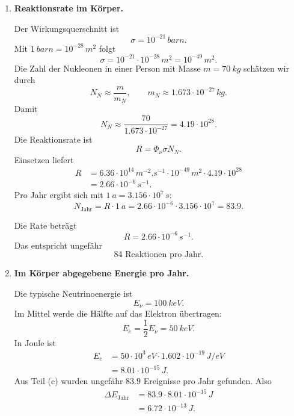 \documentclass[11pt,a4paper]{scrartcl}
\newcommand{\half}{\frac{1}{2}}
\theoremstyle{definition}
\theoremstyle{plain}
\theoremstyle{remark}
\begin{document}
\begin{enumerate}[label=(\alph*)]
    \item \textbf{Reaktionsrate im Körper.}

    \begin{calculationbox}
        Der Wirkungsquerschnitt ist
        \[
            \sigma=10^{-21}\,\si{barn}.
        \]
        Mit $\SI{1}{barn}=10^{-28}\,\si{m^2}$ folgt
        \[
            \sigma=10^{-21}\cdot10^{-28}\,\si{m^2}=10^{-49}\,\si{m^2}.
        \]
        Die Zahl der Nukleonen in einer Person mit Masse $m=\SI{70}{kg}$ schätzen wir durch
        \[
            N_N\approx\frac{m}{m_N},
            \qquad
            m_N\approx1.673\cdot10^{-27}\,\si{kg}.
        \]
        Damit
        \[
            N_N\approx\frac{70}{1.673\cdot10^{-27}}=4.19\cdot10^{28}.
        \]
        Die Reaktionsrate ist
        \[
            R=\Phi_\nu\sigma N_N.
        \]
        Einsetzen liefert
        \[
        \begin{aligned}
            R
            &=6.36\cdot10^{14}\,\si{m^{-2}.s^{-1}}
              \cdot10^{-49}\,\si{m^2}
              \cdot4.19\cdot10^{28}\\
            &=2.66\cdot10^{-6}\,\si{s^{-1}}.
        \end{aligned}
        \]
        Pro Jahr ergibt sich mit $\SI{1}{a}=3.156\cdot10^7\,\si{s}$:
        \[
            N_{\mathrm{Jahr}}
            =R\cdot\SI{1}{a}
            =2.66\cdot10^{-6}\cdot3.156\cdot10^7
            =83.9.
        \]
    \end{calculationbox}

    \begin{answerbox}
        Die Rate beträgt
        \[
            \boxed{R=2.66\cdot10^{-6}\,\si{s^{-1}}}.
        \]
        Das entspricht ungefähr
        \[
            \boxed{84\text{ Reaktionen pro Jahr}}.
        \]
    \end{answerbox}

    \item \textbf{Im Körper abgegebene Energie pro Jahr.}

    \begin{calculationbox}
        Die typische Neutrinoenergie ist
        \[
            E_\nu=\SI{100}{keV}.
        \]
        Im Mittel werde die Hälfte auf das Elektron übertragen:
        \[
            E_e=\half E_\nu=\SI{50}{keV}.
        \]
        In Joule ist
        \[
        \begin{aligned}
            E_e
            &=50\cdot10^3\,\si{eV}\cdot1.602\cdot10^{-19}\,\si{J/eV}\\
            &=8.01\cdot10^{-15}\,\si{J}.
        \end{aligned}
        \]
        Aus Teil (c) wurden ungefähr $83.9$ Ereignisse pro Jahr gefunden. Also
        \[
        \begin{aligned}
            \Delta E_{\mathrm{Jahr}}
            &=83.9\cdot8.01\cdot10^{-15}\,\si{J}\\
            &=6.72\cdot10^{-13}\,\si{J}.
        \end{aligned}
        \]
    \end{calculationbox}


\end{enumerate}
\end{document}
